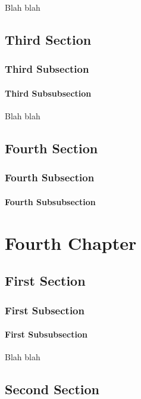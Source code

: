 \documentclass[11pt]{book}
\begin{document}
Blah blah

\section{Third Section}

\subsection{Third Subsection}

\subsubsection{Third Subsubsection}

Blah blah

\section{Fourth Section}

\subsection{Fourth Subsection}

\subsubsection{Fourth Subsubsection}

\chapter{Fourth Chapter}

\section{First Section}

\subsection{First Subsection}

\subsubsection{First Subsubsection}

Blah blah

\section{Second Section}
\end{document}
